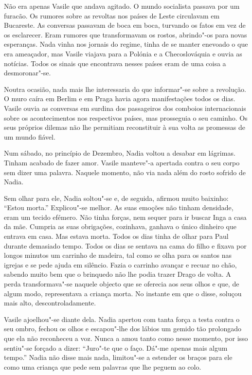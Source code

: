 \bigskip

Não era apenas Vasile que andava agitado. O mundo socialista passava por
um furacão. Os rumores sobre as revoltas nos países de Leste circulavam
em Bucareste. As conversas passavam de boca em boca, turvando os fatos
em vez de os esclarecer. Eram rumores que transformavam os rostos,
abrindo"-os para novas esperanças. Nada vinha nos jornais do regime,
tinha de se manter enevoado o que era ameaçador, mas Vasile viajava para
a Polónia e a Checoslováquia e ouvia as notícias. Todos os sinais que
encontrava nesses países eram de uma coisa a desmoronar"-se.

Noutra ocasião, nada mais lhe interessaria do que informar"-se sobre a
revolução. O muro caíra em Berlim e em Praga havia agora manifestações
todos os dias. Vasile ouvia as conversas em surdina dos passageiros dos
comboios internacionais sobre os acontecimentos nos respectivos
países, mas prosseguia o seu caminho. Os seus próprios dilemas não lhe
permitiam reconstituir à sua volta as promessas de um mundo fiável.

\bigskip

Num sábado, no princípio de Dezembro, Nadia voltou a desabar em
lágrimas. Tinham acabado de fazer amor. Vasile manteve"-a apertada contra
o seu corpo sem dizer uma palavra. Naquele momento, não via nada além do
rosto sofrido de Nadia.

Sem olhar para ele, Nadia soltou"-se e, de seguida, afirmou muito
baixinho: ``Estou morta.'' Explicou"-se melhor.
As suas emoções não tinham densidade, eram um tecido efémero. Não tinha
forças, nem sequer para ir buscar Inga a casa da mãe. Cumpria as suas
obrigações, cozinhava, ganhava o único dinheiro que entrava em casa. Mas
estava morta. Todos os dias tinha de olhar para Paul durante demasiado
tempo. Todos os dias se sentava na cama do filho e fixava por longos
minutos um carrinho de madeira, tal como se olha para os santos nas
igrejas e se pede ajuda em silêncio. Fazia o carrinho avançar e recuar
no chão, sabendo muito bem que o brinquedo não lhe podia trazer Drago de
volta. A perda transformava"-se naquele objecto que se oferecia aos seus
olhos e que, de algum modo, representava a criança morta. No instante em
que o disse, soluçou mais alto, descontroladamente.

Vasile ajoelhou"-se diante dela. Nadia apertou com tanta
força a testa contra o seu ombro, fechou os olhos e escapou"-lhe dos
lábios um gemido tão prolongado que ela não reconheceu a voz. Nunca a
amou tanto como nesse momento, por isso sentiu"-se forçado a dizer:
``Juro"-te que o faço. Dá"-me apenas mais algum tempo.'' Nadia não disse
mais nada, limitou"-se a estender os braços para ele como uma criança que
pede sem palavras que lhe peguem ao colo.


